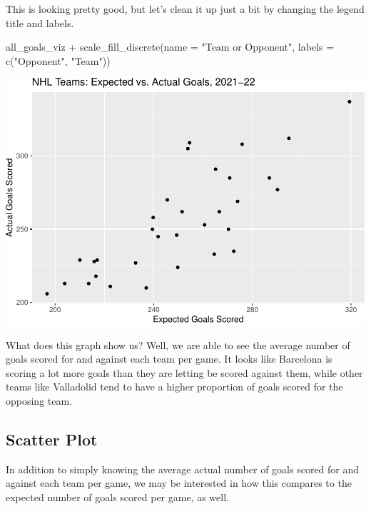 \documentclass[
  11pt,
]{book}
\newenvironment{Shaded}{\begin{snugshade}}{\end{snugshade}}
\newcommand{\AttributeTok}[1]{\textcolor[rgb]{0.77,0.63,0.00}{#1}}
\newcommand{\FunctionTok}[1]{\textcolor[rgb]{0.00,0.00,0.00}{#1}}
\newcommand{\NormalTok}[1]{#1}
\newcommand{\SpecialCharTok}[1]{\textcolor[rgb]{0.00,0.00,0.00}{#1}}
\newcommand{\StringTok}[1]{\textcolor[rgb]{0.31,0.60,0.02}{#1}}
\theoremstyle{definition}
\theoremstyle{definition}
\theoremstyle{definition}
\theoremstyle{definition}
\theoremstyle{remark}
\begin{document}
This is looking pretty good, but let's clean it up just a bit by changing the legend title and labels.

\begin{Shaded}
\begin{Highlighting}[]
\NormalTok{all\_goals\_viz }\SpecialCharTok{+} \FunctionTok{scale\_fill\_discrete}\NormalTok{(}\AttributeTok{name =} \StringTok{"Team or Opponent"}\NormalTok{, }\AttributeTok{labels =} \FunctionTok{c}\NormalTok{(}\StringTok{"Opponent"}\NormalTok{,}
    \StringTok{"Team"}\NormalTok{))}
\end{Highlighting}
\end{Shaded}

\includegraphics{series_files/figure-latex/unnamed-chunk-15-1.pdf}

What does this graph show us? Well, we are able to see the average number of goals scored for and against each team per game. It looks like Barcelona is scoring a lot more goals than they are letting be scored against them, while other teams like Valladolid tend to have a higher proportion of goals scored for the opposing team.

\hypertarget{scatter-plot}{%
\subsection{Scatter Plot}\label{scatter-plot}}

In addition to simply knowing the average actual number of goals scored for and against each team per game, we may be interested in how this compares to the expected number of goals scored per game, as well.
\end{document}
